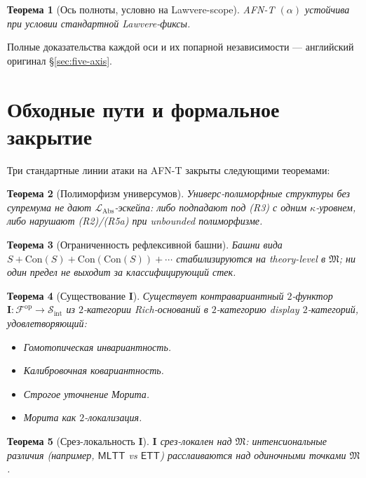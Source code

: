 \documentclass[11pt]{article}
\theoremstyle{plain}
\newtheorem{theorem}{Теорема}[section]
\theoremstyle{definition}
\newcommand{\cS}{\mathcal{S}}
\newcommand{\cF}{\mathcal{F}}
\newcommand{\fM}{\mathfrak{M}}
\newcommand{\LAbs}{\mathcal{L}_{\mathrm{Abs}}}
\newcommand{\Sint}{\cS_{\mathrm{int}}}
\newcommand{\MLTT}{\mathsf{MLTT}}
\newcommand{\ETT}{\mathsf{ETT}}
\newcommand{\II}{\mathbf{I}}
\begin{document}
\begin{theorem}[Ось полноты, условно на Lawvere-scope]\label{thm:completeness}
AFN-T $(\alpha)$ устойчива при условии стандартной Lawvere-фиксы.
\end{theorem}

Полные доказательства каждой оси и их попарной независимости — английский оригинал \S\ref{sec:five-axis}.

\section{Обходные пути и формальное закрытие}\label{sec:bypass}

Три стандартные линии атаки на AFN-T закрыты следующими теоремами:

\begin{theorem}[Полиморфизм универсумов]\label{thm:universe}
Универс-полиморфные структуры без супремума не дают $\LAbs$-эскейпа: либо подпадают под (R3) с одним $\kappa$-уровнем, либо нарушают (R2)/(R5a) при unbounded полиморфизме.
\end{theorem}

\begin{theorem}[Ограниченность рефлексивной башни]\label{thm:reflective}
Башни вида $S + \mathrm{Con}(S) + \mathrm{Con}(\mathrm{Con}(S)) + \cdots$ стабилизируются на theory-level в $\fM$; ни один предел не выходит за классифицирующий стек.
\end{theorem}

\begin{theorem}[Существование $\II$]\label{thm:I-existence}
Существует контравариантный $2$-функтор $\II : \cF^{\mathrm{op}} \to \Sint$ из $2$-категории Rich-оснований в $2$-категорию display $2$-категорий, удовлетворяющий:
\begin{itemize}
\item[\textbf{(I-1)}] Гомотопическая инвариантность.
\item[\textbf{(I-2)}] Калибровочная ковариантность.
\item[\textbf{(I-3)}] Строгое уточнение Морита.
\item[\textbf{(I-4)}] Морита как $2$-локализация.
\end{itemize}
\end{theorem}

\begin{theorem}[Срез-локальность $\II$]\label{thm:slice-locality}
$\II$ срез-локален над $\fM$: интенсиональные различия (например, $\MLTT$ vs $\ETT$) расслаиваются над одиночными точками $\fM$.
\end{theorem}
\end{document}
